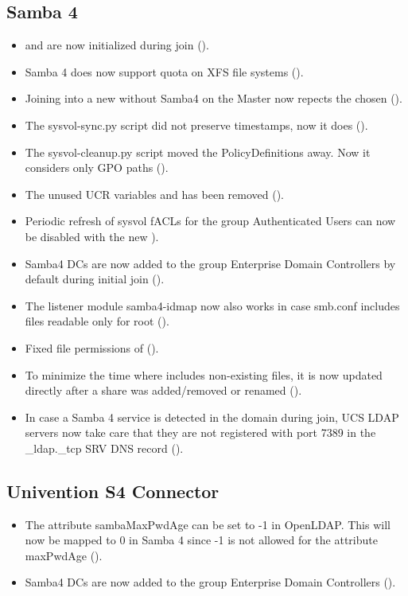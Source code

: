 \subsection{Samba 4}
\begin{itemize}
\item {} and  are now initialized during join ().
\item Samba 4 does now support quota on XFS file systems ().
\item Joining into a new  without Samba4 on the Master now repects the chosen  ().
\item The sysvol-sync.py script did not preserve timestamps, now it does ().
\item The sysvol-cleanup.py script moved the PolicyDefinitions away. Now it considers only GPO paths ().
\item The unused UCR variables  and  has been removed ().
\item Periodic refresh of sysvol fACLs for the group Authenticated Users can
now be disabled with the new  ).
\item Samba4 DCs are now added to the group Enterprise Domain Controllers
by default during initial join ().
\item The listener module samba4-idmap now also works in case smb.conf includes files readable
only for root ().
\item Fixed file permissions of  ().
\item To minimize the time where  includes non-existing files, it is now updated directly after a share was added/removed or renamed ().
\item In case a Samba 4 service is detected in the domain during join, UCS LDAP servers now take care that they are not registered with port 7389 in the \_ldap.\_tcp SRV DNS record ().
\end{itemize}

\subsection{Univention S4 Connector}
\begin{itemize}
\item The attribute sambaMaxPwdAge can be set to -1 in OpenLDAP. This will
  now be mapped to 0 in Samba 4 since -1 is not allowed for the attribute
  maxPwdAge ().
\item Samba4 DCs are now added to the group Enterprise Domain Controllers ().
\end{itemize}

